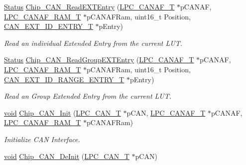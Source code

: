 \begin{DoxyCompactItemize}
\hyperlink{group__LPC__Types__Public__Types_ga67a0db04d321a74b7e7fcfd3f1a3f70b}{Status} \hyperlink{group__CAN__17XX__40XX_gad8bbd206134607402721450d085e3ccf}{Chip\-\_\-\-C\-A\-N\-\_\-\-Read\-E\-X\-T\-Entry} (\hyperlink{structLPC__CANAF__T}{L\-P\-C\-\_\-\-C\-A\-N\-A\-F\-\_\-\-T} $\ast$p\-C\-A\-N\-A\-F, \hyperlink{structLPC__CANAF__RAM__T}{L\-P\-C\-\_\-\-C\-A\-N\-A\-F\-\_\-\-R\-A\-M\-\_\-\-T} $\ast$p\-C\-A\-N\-A\-F\-Ram, uint16\-\_\-t Position, \hyperlink{structCAN__EXT__ID__ENTRY__T}{C\-A\-N\-\_\-\-E\-X\-T\-\_\-\-I\-D\-\_\-\-E\-N\-T\-R\-Y\-\_\-\-T} $\ast$p\-Entry)
\begin{DoxyCompactList}\small\item\em Read an individual Extended Entry from the current L\-U\-T. \end{DoxyCompactList}\item 
\hyperlink{group__LPC__Types__Public__Types_ga67a0db04d321a74b7e7fcfd3f1a3f70b}{Status} \hyperlink{group__CAN__17XX__40XX_ga230f718177c73eab776ae534906b5c9a}{Chip\-\_\-\-C\-A\-N\-\_\-\-Read\-Group\-E\-X\-T\-Entry} (\hyperlink{structLPC__CANAF__T}{L\-P\-C\-\_\-\-C\-A\-N\-A\-F\-\_\-\-T} $\ast$p\-C\-A\-N\-A\-F, \hyperlink{structLPC__CANAF__RAM__T}{L\-P\-C\-\_\-\-C\-A\-N\-A\-F\-\_\-\-R\-A\-M\-\_\-\-T} $\ast$p\-C\-A\-N\-A\-F\-Ram, uint16\-\_\-t Position, \hyperlink{structCAN__EXT__ID__RANGE__ENTRY__T}{C\-A\-N\-\_\-\-E\-X\-T\-\_\-\-I\-D\-\_\-\-R\-A\-N\-G\-E\-\_\-\-E\-N\-T\-R\-Y\-\_\-\-T} $\ast$p\-Entry)
\begin{DoxyCompactList}\small\item\em Read an Group Extended Entry from the current L\-U\-T. \end{DoxyCompactList}\item 
\hyperlink{Paradigm_2Tern__EE_2small_2portmacro_8h_a14d32f8130d3c0b212cfc751730b5b49}{void} \hyperlink{group__CAN__17XX__40XX_ga4995b9302885e0e577d4566d23c2ce37}{Chip\-\_\-\-C\-A\-N\-\_\-\-Init} (\hyperlink{structLPC__CAN__T}{L\-P\-C\-\_\-\-C\-A\-N\-\_\-\-T} $\ast$p\-C\-A\-N, \hyperlink{structLPC__CANAF__T}{L\-P\-C\-\_\-\-C\-A\-N\-A\-F\-\_\-\-T} $\ast$p\-C\-A\-N\-A\-F, \hyperlink{structLPC__CANAF__RAM__T}{L\-P\-C\-\_\-\-C\-A\-N\-A\-F\-\_\-\-R\-A\-M\-\_\-\-T} $\ast$p\-C\-A\-N\-A\-F\-Ram)
\begin{DoxyCompactList}\small\item\em Initialize C\-A\-N Interface. \end{DoxyCompactList}\item 
\hyperlink{Paradigm_2Tern__EE_2small_2portmacro_8h_a14d32f8130d3c0b212cfc751730b5b49}{void} \hyperlink{group__CAN__17XX__40XX_ga7f490bb9d12b30243264cd06feb795db}{Chip\-\_\-\-C\-A\-N\-\_\-\-De\-Init} (\hyperlink{structLPC__CAN__T}{L\-P\-C\-\_\-\-C\-A\-N\-\_\-\-T} $\ast$p\-C\-A\-N)

\end{DoxyCompactItemize}

